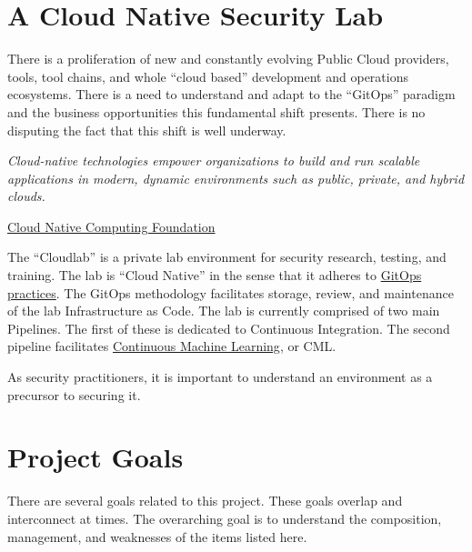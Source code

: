 






\section{\label{sec:Start}A Cloud Native Security Lab}
\vspace{2mm}
\justifying
There is a proliferation of new and constantly evolving Public Cloud providers, tools, tool chains, and whole 
``cloud based'' development and operations ecosystems. There is a need to understand and adapt to the ``GitOps'' paradigm and the
business opportunities this fundamental shift presents. There is no disputing the fact that this shift is well underway\cite{CloudShift}. 

\begin{displayquote}
	\emph{Cloud-native technologies empower organizations to build and run scalable applications in modern, dynamic environments such as public,
	private, and hybrid clouds.}
	
	\href{https://www.cncf.io/about/who-we-are/}{Cloud Native Computing Foundation}
\end{displayquote}

\justifying
The ``Cloudlab'' is a private lab environment for security research, testing, and training. The lab is ``Cloud Native'' in the sense that it
adheres to \href{https://www.cloudbees.com/gitops/what-is-gitops}{GitOps practices}. The GitOps methodology facilitates storage, review, and
maintenance of the lab Infrastructure as Code. The lab is currently comprised of two main Pipelines. The first of these is dedicated to Continuous
Integration. The second pipeline facilitates \href{https://cml.dev/doc}{Continuous Machine Learning}, or CML\cite{books/mit/026233758}.

\justifying
As security practitioners, it is important to understand an environment as a precursor to securing it.

\section{\label{sec:Project}Project Goals}
\vspace{2mm}
\justifying
There are several goals related to this project. These goals overlap and interconnect at times. The overarching goal is to understand the composition,
management, and weaknesses of the items listed here.


